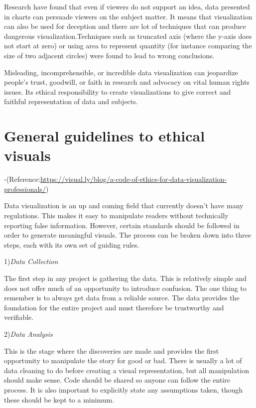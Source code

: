 \documentclass[]{book}
\theoremstyle{definition}
\theoremstyle{definition}
\theoremstyle{definition}
\theoremstyle{remark}
\begin{document}
Research have found that even if viewers do not support an idea, data
presented in charts can persuade viewers on the subject matter. It means
that visualization can also be used for deception and there are lot of
techniques that can produce dangerous visualization.Techniques such as
truncated axis (where the y-axis does not start at zero) or using area
to represent quantity (for instance comparing the size of two adjacent
circles) were found to lead to wrong conclusions.

Misleading, incomprehensible, or incredible data visualization can
jeopardize people's trust, goodwill, or faith in research and advocacy
on vital human rights issues. Its ethical responsibility to create
visualizations to give correct and faithful representation of data and
subjects.

\section{General guidelines to ethical
visuals}\label{general-guidelines-to-ethical-visuals}

-(Reference:\url{https://visual.ly/blog/a-code-of-ethics-for-data-visualization-professionals/})

Data visualization is an up and coming field that currently doesn't have
many regulations. This makes it easy to manipulate readers without
technically reporting false information. However, certain standards
should be followed in order to generate meaningful visuals. The process
can be broken down into three steps, each with its own set of guiding
rules.

1)\emph{Data Collection}

The first step in any project is gathering the data. This is relatively
simple and does not offer much of an opportunity to introduce confusion.
The one thing to remember is to always get data from a reliable source.
The data provides the foundation for the entire project and must
therefore be trustworthy and verifiable.

2)\emph{Data Analysis}

This is the stage where the discoveries are made and provides the first
opportunity to manipulate the story for good or bad. There is usually a
lot of data cleaning to do before creating a visual representation, but
all manipulation should make sense. Code should be shared so anyone can
follow the entire process. It is also important to explicitly state any
assumptions taken, though these should be kept to a minimum.
\end{document}
